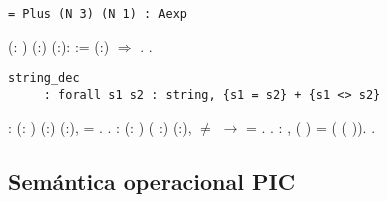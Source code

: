 \documentclass[12pt]{report}
\begin{document}
\begin{verbatim}
= Plus (N 3) (N 1) : Aexp     
\end{verbatim}
\begin{coqdoccode}
\coqdocemptyline
\coqdocnoindent
{}  (: ) (:) (:):  := \coqdoceol
\coqdocindent{1.00em}
 (:) \ensuremath{\Rightarrow}         .\coqdoceol
\coqdocemptyline
\coqdocnoindent
{} .\coqdoceol
\end{coqdoccode}


\begin{verbatim}
string_dec
     : forall s1 s2 : string, {s1 = s2} + {s1 <> s2}
\end{verbatim}
\begin{coqdoccode}
\coqdocemptyline
\coqdocnoindent
{} : \coqdockw{\ensuremath{\forall}} (: ) (:) (:),      = .\coqdoceol
\coqdocnoindent
{}.\coqdoceol
\coqdocemptyline
\coqdocnoindent
{} : \coqdockw{\ensuremath{\forall}} (: ) ( :) (:),  \ensuremath{\not=}  \ensuremath{\rightarrow}      =  .\coqdoceol
\coqdocnoindent
{}.\coqdoceol
\coqdocemptyline
\coqdocnoindent
{} : \coqdockw{\ensuremath{\forall}}    , \coqdoceol
\coqdocnoindent
{} (   )  =   (   (  )).\coqdoceol
\coqdocnoindent
{}.\coqdoceol
\coqdocemptyline
\end{coqdoccode}
\subsection{Semántica operacional PIC}
\end{document}
